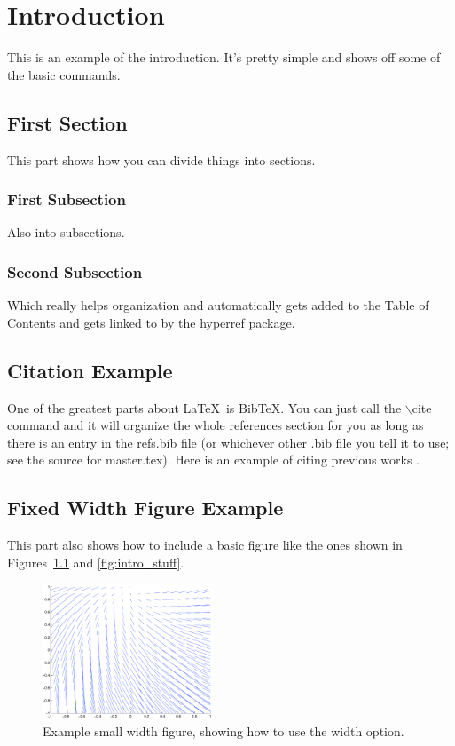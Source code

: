 \chapter{Introduction}
\label{chp:chapter1}
\graphicspath{{figures/}{figures/chapter1/}}
This is an example of the introduction. It's pretty simple and shows off
some of the basic commands.

\section{First Section}
This part shows how you can divide things into sections.

\subsection{First Subsection}
Also into subsections.

\subsection{Second Subsection}
Which really helps organization and automatically gets added to the Table
of Contents and gets linked to by the hyperref package.

\section{Citation Example}
One of the greatest parts about \LaTeX\ is BibTeX. You can just call
the $\backslash$cite command and it will organize the whole references section for you as long as there is an entry in the refs.bib file (or whichever other .bib file you tell it to use; see the source for master.tex).
Here is an example of citing previous works
\cite{guy06best,guy06second}.

\section{Fixed Width Figure Example} \label{sec:intro_figure_example}
This part also shows how to include a basic figure like the ones
shown in Figures~\ref{fig:intro_stuff2} and \ref{fig:intro_stuff}. %
\begin{figure}[t]
  \centering
  \includegraphics[width = 2in]{stuff}
  \caption[Example small width figure]{
Example small width figure, showing how to use the width option.}
%
  \label{fig:intro_stuff2}
\end{figure}

